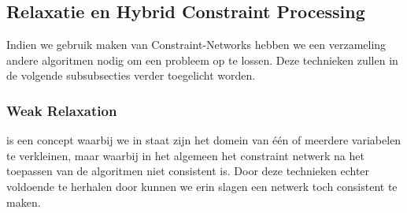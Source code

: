 \subsection{Relaxatie en Hybrid Constraint Processing}
\label{ss:relaxationAndHybridConstraintProcessing}
Indien we gebruik maken van Constraint-Networks hebben we een verzameling andere algoritmen nodig om een probleem op te lossen. Deze technieken zullen in de volgende subsubsecties verder toegelicht worden.
\subsubsection{Weak Relaxation}
 is een concept waarbij we in staat zijn het domein van één of meerdere variabelen te verkleinen, maar waarbij in het algemeen het constraint netwerk na het toepassen van de algoritmen niet consistent is. Door deze technieken echter voldoende te herhalen door  kunnen we erin slagen een netwerk toch consistent te maken.
